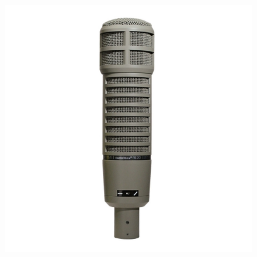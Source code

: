 \documentclass[
  letterpaper,
  DIV=11,
  numbers=noendperiod]{scrreprt}
\begin{document}
\begin{figure}
\begin{minipage}[t]{0.33\linewidth}
{{\includegraphics{outils_equipements/../_resources/bitmap/mic/re20.jpg}

}

}

\end{minipage}%
%
\begin{minipage}[t]{0.33\linewidth}

{\centering 

}
\end{minipage}
\end{figure}
\end{document}

